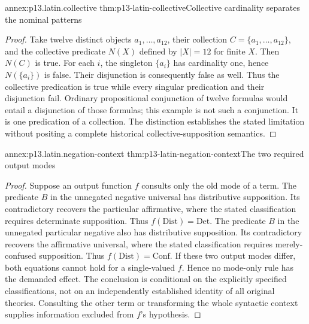 \begin{annexitem}{annex:p13.latin.collective}
 {thm:p13-latin-collective}{Collective cardinality separates the nominal patterns}
\begin{proof}
Take twelve distinct objects \(a_1,\ldots,a_{12}\), their collection
\(C=\{a_1,\ldots,a_{12}\}\), and the collective predicate
\(N(X)\) defined by \(|X|=12\) for finite \(X\).
Then \(N(C)\) is true. For each \(i\), the singleton \(\{a_i\}\)
has cardinality one, hence \(N(\{a_i\})\) is false.
Their disjunction is consequently false as well.
Thus the collective predication is true while every singular predication
and their disjunction fail. Ordinary propositional conjunction of
twelve formulas would entail a disjunction of those formulas; this
example is not such a conjunction. It is one predication of a collection.
The distinction establishes the stated limitation without positing
a complete historical collective-supposition semantics.
\end{proof}
\end{annexitem}

\begin{annexitem}{annex:p13.latin.negation-context}
 {thm:p13-latin-negation-context}{The two required output modes}
\begin{proof}
Suppose an output function \(f\) consults only the old mode of a term.
The predicate \(B\) in the unnegated negative universal
has distributive supposition. Its contradictory recovers the particular
affirmative, where the stated classification requires determinate
supposition. Thus \(f(\mathrm{Dist})=\mathrm{Det}\).
The predicate \(B\) in the unnegated particular negative also has
distributive supposition. Its contradictory recovers the affirmative
universal, where the stated classification requires merely-confused
supposition. Thus \(f(\mathrm{Dist})=\mathrm{Conf}\).
If these two output modes differ, both equations cannot hold for a
single-valued \(f\). Hence no mode-only rule has the demanded effect.
The conclusion is conditional on the explicitly specified classifications,
not on an independently established identity of all original theories.
Consulting the other term or transforming the whole syntactic context
supplies information excluded from \(f\)'s hypothesis.
\end{proof}
\end{annexitem}

